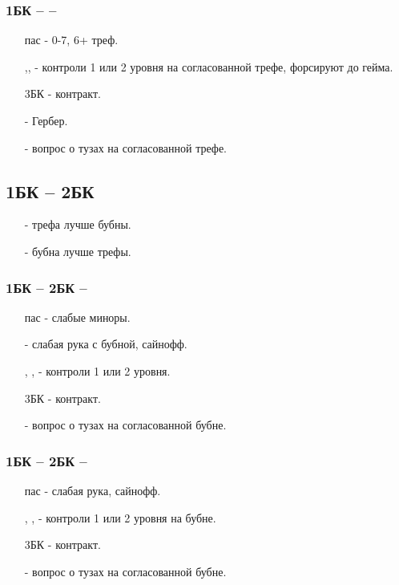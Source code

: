 \documentclass{article}
\begin{document}
\subsubsection{1БК --  -- }
\begin{enumerate}
    \item[пас] - 0-7, 6+ треф.
    \item[\di{3},\he{3}, \sp{3}] - контроли 1 или 2 уровня на согласованной трефе, форсируют до гейма.
    \item[3БК] - контракт.
    \item[\cl{4}] - Гербер.
    \item[\di{4}] - вопрос о тузах на согласованной трефе.
\end{enumerate}
\subsection{1БК -- 2БК}
\begin{enumerate}
    \item[\cl{3}] - трефа лучше бубны.
    \item[\di{3}] - бубна лучше трефы.
\end{enumerate}
\subsubsection{1БК -- 2БК -- }
\begin{enumerate}
    \item[пас] - слабые миноры.
    \item[\di{3}] - слабая рука с бубной, сайнофф.
    \item[\he{3}, \sp{3}, \cl{4}] - контроли 1 или 2 уровня.
    \item[3БК] - контракт.
    \item[\he{4}] - вопрос о тузах на согласованной бубне.
\end{enumerate}
\subsubsection{1БК -- 2БК -- }
\begin{enumerate}
    \item[пас] - слабая рука, сайнофф.
    \item[\he{3}, \sp{3}, \cl{4}] - контроли 1 или 2 уровня на бубне.
    \item[3БК] - контракт.
    \item[\he{4}] - вопрос о тузах на согласованной бубне.
\end{enumerate}
\end{document}
